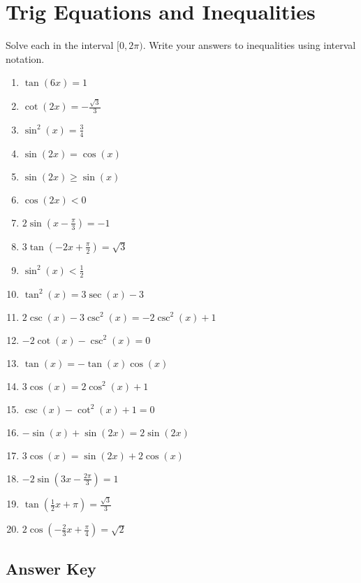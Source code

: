 \chapter{Trig Equations and Inequalities}

Solve each in the interval $[0,2\pi)$. Write your answers to inequalities using interval notation.

\begin{enumerate}
	\item $\tan(6x) = 1$
    \item $\cot(2x) = -\frac{\sqrt{3}}{3}$
    \item $\sin^2 (x) = \frac{3}{4}$
    \item $\sin(2x) = \cos(x)$
    \item $\sin(2x) \geq \sin(x)$
    \item $\cos(2x) < 0$
    \item $2\sin\left(x-\frac{\pi}{3}\right) = -1$
    \item $3\tan\left(-2x+\frac{\pi}{2}\right)=\sqrt{3}$
    \item $\sin^2(x) < \frac{1}{2}$
    
    \item $\tan^2(x) = 3\sec(x) - 3$
    \item $2\csc(x) - 3\csc^2(x) = -2\csc^2(x) + 1$
    \item $-2\cot(x) - \csc^2(x) = 0$
    \item $\tan(x) = -\tan(x)\cos(x)$
    \item $3\cos(x) = 2\cos^2(x) + 1$
    \item $\csc(x) - \cot^2(x) + 1 = 0$
    \item $-\sin(x) + \sin(2x) = 2\sin(2x)$
    \item $3\cos(x) = \sin(2x) + 2\cos(x)$
    
    \item $-2\sin\left(3x-\frac{2\pi}{3}\right) = 1$
    \item $\tan\left(\frac{1}{2}x + \pi\right) = \frac{\sqrt{3}}{3}$
    \item $2\cos\left(-\frac{2}{3}x+\frac{\pi}{4}\right) = \sqrt{2}$
\end{enumerate}

\newpage

\section{Answer Key}

